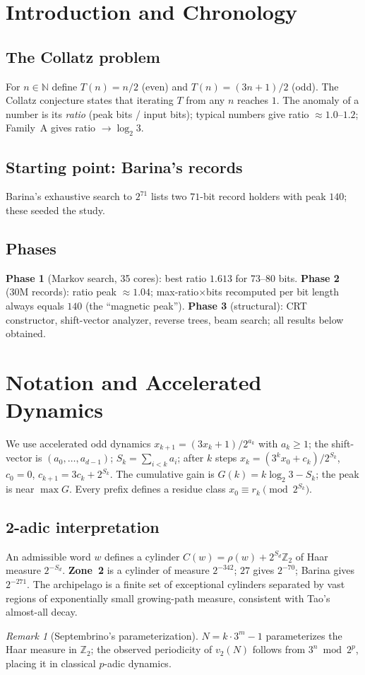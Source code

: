 \documentclass[12pt,a4paper]{article}
\theoremstyle{remark}
\newtheorem{remark}[theorem]{Remark}
\begin{document}
\section{Introduction and Chronology}
\subsection{The Collatz problem}
For $n\in\mathbb N$ define $T(n)=n/2$ (even) and $T(n)=(3n+1)/2$ (odd). The
Collatz conjecture states that iterating $T$ from any $n$ reaches $1$. The
anomaly of a number is its \emph{ratio} (peak bits / input bits); typical
numbers give ratio $\approx1.0$--$1.2$; Family~A gives ratio $\to\log_2 3$.
\subsection{Starting point: Barina's records}
Barina's exhaustive search to $2^{71}$ lists two $71$-bit record holders with
peak $140$; these seeded the study.
\subsection{Phases}
\textbf{Phase 1} (Markov search, 35 cores): best ratio $1.613$ for 73--80 bits.
\textbf{Phase 2} (30M records): ratio peak $\approx1.04$; max-ratio$\times$bits
recomputed per bit length always equals $140$ (the ``magnetic peak'').
\textbf{Phase 3} (structural): CRT constructor, shift-vector analyzer, reverse
trees, beam search; all results below obtained.

\section{Notation and Accelerated Dynamics}
We use accelerated odd dynamics
$x_{k+1}=(3x_k+1)/2^{a_k}$ with $a_k\ge1$; the shift-vector is
$(a_0,\dots,a_{d-1})$; $S_k=\sum_{i<k}a_i$; after $k$ steps
$x_k=(3^k x_0+c_k)/2^{S_k}$, $c_0=0$, $c_{k+1}=3c_k+2^{S_k}$.
The cumulative gain is $G(k)=k\log_2 3-S_k$; the peak is near $\max G$.
Every prefix defines a residue class $x_0\equiv r_k\pmod{2^{S_k}}$.
\subsection{2-adic interpretation}
An admissible word $w$ defines a cylinder $C(w)=\rho(w)+2^{S_d}\mathbb Z_2$ of
Haar measure $2^{-S_d}$. \textbf{Zone~2} is a cylinder of measure $2^{-342}$;
$27$ gives $2^{-70}$; Barina gives $2^{-271}$. The archipelago is a finite set
of exceptional cylinders separated by vast regions of exponentially small
growing-path measure, consistent with Tao's almost-all decay.
\begin{remark}[Septembrino's parameterization]
$N=k\cdot3^m-1$ parameterizes the Haar measure in $\mathbb Z_2$; the observed
periodicity of $v_2(N)$ follows from $3^n\bmod2^p$, placing it in classical
$p$-adic dynamics.
\end{remark}
\end{document}
